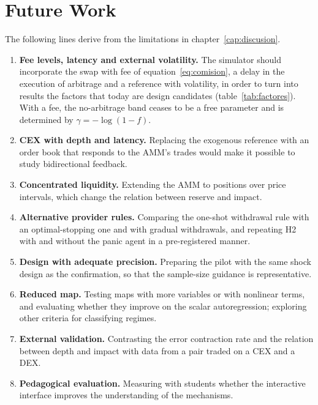 \chapter{Future Work}
\label{cap:futuro}

The following lines derive from the limitations in chapter~\ref{cap:discusion}.

\begin{enumerate}
  \item \textbf{Fee levels, latency and external volatility.} The simulator should incorporate the swap with fee of equation~\eqref{eq:comision}, a delay in the execution of arbitrage and a reference with volatility, in order to turn into results the factors that today are design candidates (table~\ref{tab:factores}). With a fee, the no-arbitrage band ceases to be a free parameter and is determined by $\gamma=-\log(1-f)$.
  \item \textbf{CEX with depth and latency.} Replacing the exogenous reference with an order book that responds to the AMM's trades would make it possible to study bidirectional feedback.
  \item \textbf{Concentrated liquidity.} Extending the AMM to positions over price intervals, which change the relation between reserve and impact.
  \item \textbf{Alternative provider rules.} Comparing the one-shot withdrawal rule with an optimal-stopping one \cite{bergault2025exit} and with gradual withdrawals, and repeating H2 with and without the panic agent in a pre-registered manner.
  \item \textbf{Design with adequate precision.} Preparing the pilot with the same shock design as the confirmation, so that the sample-size guidance is representative.
  \item \textbf{Reduced map.} Testing maps with more variables or with nonlinear terms, and evaluating whether they improve on the scalar autoregression; exploring other criteria for classifying regimes.
  \item \textbf{External validation.} Contrasting the error contraction rate and the relation between depth and impact with data from a pair traded on a CEX and a DEX.
  \item \textbf{Pedagogical evaluation.} Measuring with students whether the interactive interface improves the understanding of the mechanisms.
\end{enumerate}
